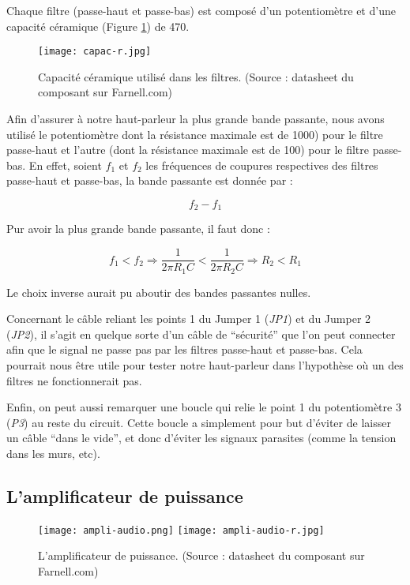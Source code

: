 Chaque filtre (passe-haut et passe-bas) est composé d'un potentiomètre et d'une capacité céramique
(Figure \ref{capac-r}) de \unit{470}{\nano\farad}.

\begin{figure}[!htb]
	\centering
	\texttt{[image: capac-r.jpg]}
	\caption{Capacité céramique utilisé dans les filtres. (Source : datasheet du composant sur Farnell.com)}
	\label{capac-r}
\end{figure}

Afin d'assurer à notre haut-parleur la plus grande bande passante, nous avons utilisé le potentiomètre
dont la résistance maximale est de \unit{1000}{\ohm}) pour le filtre passe-haut et
l'autre (dont la résistance maximale est de \unit{100}{\ohm}) pour le filtre passe-bas. En effet, soient
$f_1$ et $f_2$ les fréquences de coupures respectives des filtres passe-haut et passe-bas, la bande passante
est donnée par :

$$f_2 - f_1$$

Pur avoir la plus grande bande passante, il faut donc :

$$f_1 < f_2 \Rightarrow \frac{1}{2\pi R_1C} < \frac{1}{2\pi R_2C} \Rightarrow R_2 < R_1$$

Le choix inverse aurait pu aboutir des bandes passantes nulles.

Concernant le câble reliant les points 1 du Jumper 1 (\textit{JP1}) et du Jumper 2 (\textit{JP2}), 
il s'agit en quelque sorte d'un câble de "`sécurité"' que l'on peut connecter afin que le signal 
ne passe pas par les filtres passe-haut et passe-bas. 
Cela pourrait nous être utile pour tester notre haut-parleur dans l'hypothèse où un des filtres 
ne fonctionnerait pas.

Enfin, on peut aussi remarquer une boucle qui relie le point 1 du potentiomètre 3 (\textit{P3})
au reste du circuit. Cette boucle a simplement pour but d'éviter de laisser un câble "`dans le vide"',
et donc d'éviter les signaux parasites (comme la tension dans les murs, etc).

\subsection{L'amplificateur de puissance}

\begin{figure}[!htb]
	\centering
	\texttt{[image: ampli-audio.png]}
	\texttt{[image: ampli-audio-r.jpg]}
	\caption{L'amplificateur de puissance. (Source : datasheet du composant sur Farnell.com)}
	\label{ampli-audio}
\end{figure}


